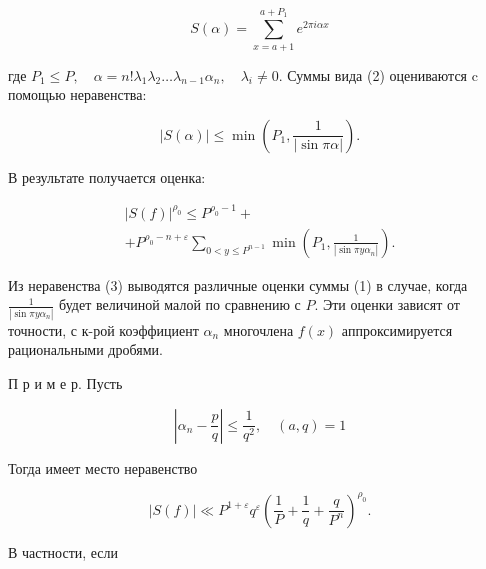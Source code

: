 \documentclass[10pt]{article}
\begin{document}
\[

S(\alpha)=\sum_{x=a+1}^{a+P_{1}} e^{2 \pi i \alpha x}

\]



где $P_{1} \leqslant P, \quad \alpha=n ! \lambda_{1} \lambda_{2} \ldots \lambda_{n-1} \alpha_{n}, \quad \lambda_{i} \neq 0$. Суммы вида (2) оцениваются $\mathrm{c}$ помощью неравенства:



\[

|S(\alpha)| \leqslant \min \left(P_{1}, \frac{1}{|\sin \pi \alpha|}\right) .

\]



В результате получается оценка:



\[

\begin{gathered}

|S(f)|^{\rho_{0}} \leqslant P^{\rho_{0}-1}+ \\

+P^{\rho_{0}-n+\varepsilon} \sum_{0<y \leqslant P^{n-1}} \min \left(P_{1}, \frac{1}{\left|\sin \pi y \alpha_{n}\right|}\right) .

\end{gathered}

\]



Из неравенства (3) выводятся различные оценки суммы (1) в случае, когда $\frac{1}{\left|\sin \pi y \alpha_{n}\right|}$ будет величиной малой по сравнению с $P$. Эти оценки зависят от точности, с к-рой коэффициент $\alpha_{n}$ многочлена $f(x)$ аппроксимируется рациональными дробями.



П р и м е р. Пусть



\[

\left|\alpha_{n}-\frac{p}{q}\right| \leqslant \frac{1}{q^{2}}, \quad(a, q)=1

\]



Тогда имеет место неравенство



\[

|S(f)| \ll P^{1+\varepsilon} q^{\varepsilon}\left(\frac{1}{P}+\frac{1}{q}+\frac{q}{P^{n}}\right)^{\rho_{0}} .

\]



В частности, если
\end{document}
